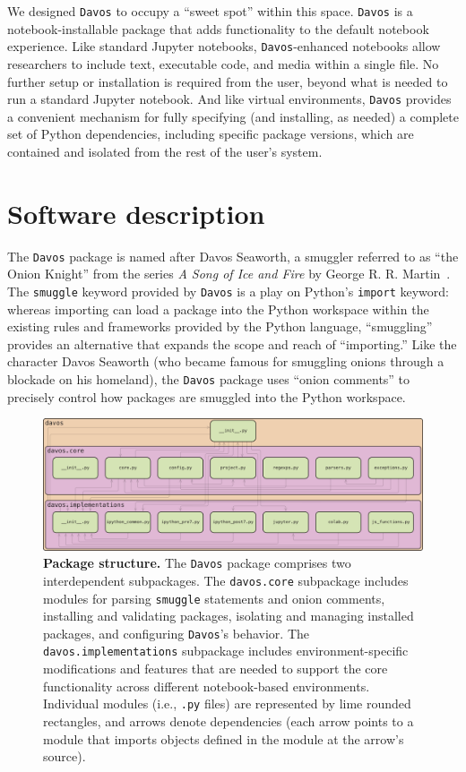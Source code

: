 \documentclass[preprint,12pt,a4paper]{elsarticle}
\begin{document}
We designed \texttt{Davos} to occupy a ``sweet spot'' within this space.
\texttt{Davos} is a notebook-installable package that adds functionality to the
default notebook experience. Like standard Jupyter notebooks,
\texttt{Davos}-enhanced notebooks allow researchers to include text, executable
code, and media within a single file. No further setup or installation is
required from the user, beyond what is needed to run a standard Jupyter
notebook. And like virtual environments, \texttt{Davos} provides a convenient
mechanism for fully specifying (and installing, as needed) a complete set of
Python dependencies, including specific package versions, which are contained
and isolated from the rest of the user's system.


\section{Software description}

The \texttt{Davos} package is named after Davos Seaworth, a smuggler referred
to as ``the Onion Knight'' from the series \textit{A Song of Ice and Fire} by
George R. R. Martin~\cite{Mart98}. The \texttt{smuggle} keyword provided by
\texttt{Davos} is a play on Python's \texttt{import} keyword: whereas importing
can load a package into the Python workspace within the existing rules and
frameworks provided by the Python language, ``smuggling'' provides an
alternative that expands the scope and reach of ``importing.'' Like the
character Davos Seaworth (who became famous for smuggling onions through a
blockade on his homeland), the \texttt{Davos} package uses ``onion comments'' to precisely control how
packages are smuggled into the Python workspace.

\begin{figure}[tp]
\centering
\includegraphics[width=\textwidth]{figs/package_structure}
\caption{\small \textbf{Package structure.} The \texttt{Davos} package
  comprises two interdependent subpackages.  The \texttt{davos.core}
  subpackage includes modules for parsing \texttt{smuggle} statements
  and onion comments, installing and validating packages, isolating and managing
  installed packages, and configuring \texttt{Davos}'s behavior.  The
  \texttt{davos.implementations} subpackage includes
  environment-specific modifications and features that are needed to
  support the core functionality across different notebook-based
  environments.  Individual modules (i.e., \texttt{.py} files) are represented by lime
  rounded rectangles, and arrows denote dependencies (each arrow
  points to a module that imports objects defined in the module at the
  arrow's source).}
\label{fig:package-structure}
\end{figure}
\end{document}
